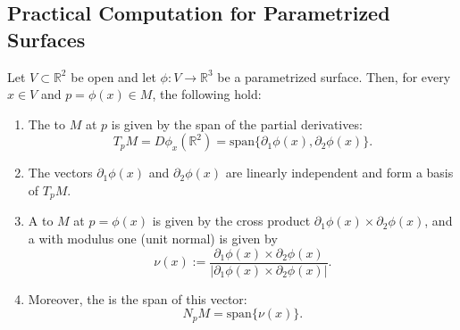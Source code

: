 \subsection{Practical Computation for Parametrized Surfaces}

\setcounter{savedSec}{\value{section}}
\setcounter{savedThm}{\value{theorem}}
\setcounter{section}{12}
\setcounter{theorem}{15}

\begin{theorem} %
Let $V \subset \mathbb{R}^2$ be open and let $\phi : V \to \mathbb{R}^3$ be a parametrized surface. Then, for every $x \in V$ and $p = \phi(x) \in M$, the following hold: %
\begin{enumerate}
    \item The  to $M$ at $p$ is given by the span of the partial derivatives:
    \[
    T_pM = D\phi_x(\mathbb{R}^2) = \text{span}\{\partial_1\phi(x), \partial_2\phi(x)\}. %
    \]
    \item The vectors $\partial_1\phi(x)$ and $\partial_2\phi(x)$ are linearly independent and form a basis of $T_pM$. %
    \item A  to $M$ at $p = \phi(x)$ is given by the cross product $\partial_1\phi(x) \times \partial_2\phi(x)$, and a  with modulus one (unit normal) is given by %
    \[
    \nu(x) := \frac{\partial_1\phi(x) \times \partial_2\phi(x)}{|\partial_1\phi(x) \times \partial_2\phi(x)|}. %
    \]
    \item Moreover, the  is the span of this vector:
    \[
    N_pM = \text{span}\{\nu(x)\}. %
    \]
\end{enumerate}
\end{theorem}

\setcounter{section}{\value{savedSec}}
\setcounter{theorem}{\value{savedThm}}

